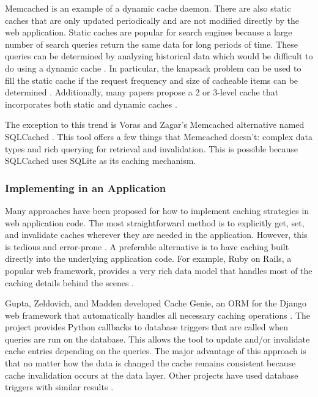 \documentclass[12pt]{ucthesis}
\begin{document}
{\textsf Memcached} is an example of a dynamic cache daemon.
There are also static caches that are only updated periodically and are not modified directly by the web application.
Static caches are popular for search engines because a large number of search queries return the same data for long periods of time.
These queries can be determined by analyzing historical data which would be difficult to do using a dynamic cache \cite{designTradeOffsSearchEngine}.
In particular, the knapsack problem can be used to fill the static cache if the request frequency and size of cacheable items can be determined \cite{designTradeOffsSearchEngine}.
Additionally, many papers propose a 2 or 3-level cache that incorporates both static and dynamic caches \cite{cacheAdmissionPolicies, designTradeOffsSearchEngine}.

The exception to this trend is Voras and Zagar's {\textsf Memcached} alternative named SQLCached \cite{sqlCached}.
This tool offers a few things that {\textsf Memcached} doesn't: complex data types and rich querying for retrieval and invalidation.
This is possible because SQLCached uses SQLite as its caching mechanism.

\subsubsection{Implementing in an Application}
Many approaches have been proposed for how to implement caching strategies in web application code.
The most straightforward method is to explicitly get, set, and invalidate caches wherever they are needed in the application.
However, this is tedious and error-prone \cite{keyBasedCacheExpiration, triggerBasedORM}.
A preferable alternative is to have caching built directly into the underlying application code.
For example, Ruby on Rails, a popular web framework, provides a very rich data model that handles most of the caching details behind the scenes \cite{keyBasedCacheExpiration}.

Gupta, Zeldovich, and Madden developed Cache Genie, an ORM for the Django web framework that automatically handles all necessary caching operations \cite{triggerBasedORM}.
The project provides Python callbacks to database triggers that are called when queries are run on the database.
This allows the tool to update and/or invalidate cache entries depending on the queries.
The major advantage of this approach is that no matter how the data is changed the cache remains consistent because cache invalidation occurs at the data layer.
Other projects have used database triggers with similar results \cite{scalableConsistentCaching}.
\end{document}

